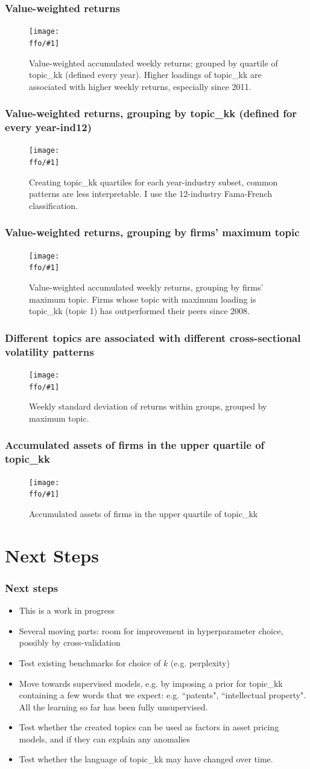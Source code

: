 \documentclass{beamer}
\newcommand{\ffo}{dicfullmc10thr10defnob40noa1_4t}
\newcommand{\insertfigure}[2]{
\begin{figure}[h!]
  \centering
  \texttt{[image: \\ffo/\#1]}
  \centering
  \captionsetup{font=scriptsize}
  \caption{#2}
  \label{fig:#1}
\end{figure}
}
\begin{document}
\begin{frame}
\frametitle{Value-weighted returns}
\insertfigure{awawr}{Value-weighted accumulated weekly returns; grouped by quartile of topic\_kk (defined every year). Higher loadings of topic\_kk are associated with higher weekly returns, especially since 2011. }
\end{frame}



\begin{frame}
\frametitle{Value-weighted returns, grouping by topic\_kk (defined for every year-ind12)}
\insertfigure{awawr_aggind}{Creating topic\_kk quartiles for each year-industry subset, common patterns are less interpretable. I use the 12-industry Fama-French classification.}
\end{frame}

\begin{frame}
\frametitle{Value-weighted returns, grouping by firms' maximum topic}
\insertfigure{awawr_byg}{Value-weighted accumulated weekly returns, grouping by firms' maximum topic. Firms whose topic with maximum loading is topic\_kk (topic 1) has outperformed their peers since 2008.}
\end{frame}

\begin{frame}
\frametitle{Different topics are associated with different cross-sectional volatility patterns}
\insertfigure{wsdr_byg}{Weekly standard deviation of returns within groups, grouped by maximum topic.}
\end{frame}

\begin{frame}
\frametitle{Accumulated assets of firms in the upper quartile of topic\_kk}
\insertfigure{stackedplot_at}{Accumulated assets of firms in the upper quartile of topic\_kk}
\end{frame}



\section{Next Steps}

\begin{frame}
\frametitle{Next steps}
\begin{itemize}
\item This is a work in progress
\item Several moving parts: room for improvement in hyperparameter choice, possibly by cross-validation
\item Test existing benchmarks for choice of $k$ (e.g. perplexity)
\item Move towards supervised models, e.g. by imposing a prior for topic\_kk containing a few words that we expect: e.g. ``patents", ``intellectual property". All the learning so far has been fully unsupervised. 
\item Test whether the created topics can be used as factors in asset pricing models, and if they can explain any anomalies
\item Test whether the language of topic\_kk may have changed over time.
\end{itemize}
\end{frame}
\end{document}
